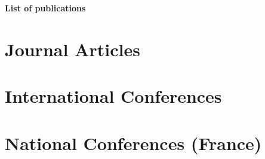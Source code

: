 \documentclass[11pt,a4paper]{article}
\begin{document}
\begin{center}
    {\LARGE \textbf{List of publications}}
\end{center}

\section*{Journal Articles}
\nocite{soulej2025jaamas}
\printbibliography[keyword=journal, heading=none, sorting=ydnt]

\bigskip

\section*{International Conferences}
\nocite{soulej2025cloud}
\nocite{soule2024moise_marl}
\nocite{soule2024marl}
\nocite{soulej2023sim}
\printbibliography[keyword=international, heading=none, sorting=ydnt]

\bigskip

\section*{National Conferences (France)}
\nocite{soule2025jfsma}
\nocite{soule2024outil}
\nocite{soule2024approche}
\nocite{soule2023jfsmathese}
\nocite{soule2023ressithese}
\nocite{soule2023rjciathese}
\printbibliography[keyword=national, heading=none, sorting=ydnt]
\end{document}
